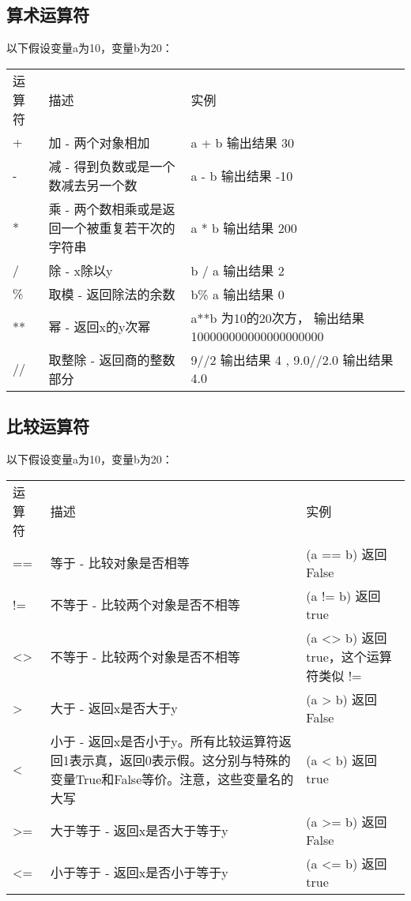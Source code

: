 \subsection{算术运算符}
以下假设变量a为10，变量b为20：

\begin{tabular}{l|l|l}
运算符&	描述&	实例\\
+&	加 - 两个对象相加&	a + b 输出结果 30\\
-&	减 - 得到负数或是一个数减去另一个数&	a - b 输出结果 -10\\
*&	乘 - 两个数相乘或是返回一个被重复若干次的字符串&	a * b 输出结果 200\\
/&	除 - x除以y&	b / a 输出结果 2\\
\%&	取模 - 返回除法的余数&	b\% a 输出结果 0\\
**&	幂 - 返回x的y次幂	&a**b 为10的20次方， 输出结果 100000000000000000000\\
//&	取整除 - 返回商的整数部分	&9//2 输出结果 4 , 9.0//2.0 输出结果 4.0
\end{tabular}


\subsection{比较运算符}
以下假设变量a为10，变量b为20：

\begin{tabular}{l|l|l}
运算符&	描述&	实例\\
==&	等于 - 比较对象是否相等&	(a == b) 返回 False\\
!=&	不等于 - 比较两个对象是否不相等&	(a != b) 返回 true\\
<>	&不等于 - 比较两个对象是否不相等&	(a <> b) 返回 true，这个运算符类似 != \\
>	&大于 - 返回x是否大于y&	(a > b) 返回 False\\
<	&小于 - 返回x是否小于y。所有比较运算符返回1表示真，返回0表示假。这分别与特殊的变量True和False等价。注意，这些变量名的大写&	(a < b) 返回 true\\
>=	&大于等于 - 返回x是否大于等于y&	(a >= b) 返回 False\\
<=	&小于等于 - 返回x是否小于等于y&	(a <= b) 返回 true
\end{tabular}



